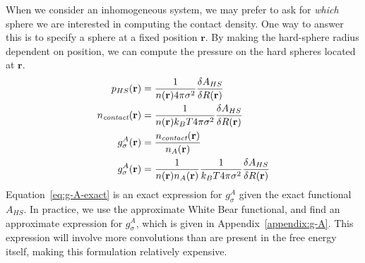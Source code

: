 \documentclass[letterpaper,twocolumn,amsmath,amssymb,jcp,10pt,aip]{revtex4-1}
\newcommand{\rr}{\textbf{r}}
\begin{document}
When we consider an inhomogeneous system, we may prefer to ask for
\emph{which} sphere we are interested in computing the contact
density.  One way to answer this is to specify a sphere at a fixed
position $\mathbf{r}$.  By making the hard-sphere radius dependent on
position, we can compute the pressure on the hard spheres located at
$\mathbf{r}$.
\begin{align}
  p_{HS}(\mathbf{r}) &= \frac{1}{n(\rr) 4\pi \sigma^2} \frac{\delta
    A_{HS}}{\delta R(\mathbf{r})} \\
  \ncontact(\rr) &= \frac{1}{n(\rr) k_BT 4\pi \sigma^2} \frac{\delta
    A_{HS}}{\delta R(\mathbf{r})} \\
  g_\sigma^A(\rr) &= \frac{\ncontact(\rr)}{n_A(\rr)} \\
  g_\sigma^A(\rr) &= \frac{1}{n(\rr) n_A(\rr)}\frac{1}{ k_BT 4\pi \sigma^2} \frac{\delta
    A_{HS}}{\delta R(\mathbf{r})} \label{eq:g-A-exact}
\end{align}
Equation~\ref{eq:g-A-exact} is an exact expression for $g_\sigma^A$
given the exact functional $A_{HS}$.  In practice, we use the
approximate White Bear functional, and find an approximate expression
for $g_\sigma^A$, which is given in Appendix~\ref{appendix:g-A}.  This
expression will involve more convolutions than are present in the free
energy itself, making this formulation relatively expensive.
\end{document}
